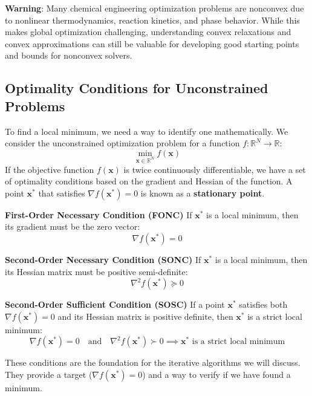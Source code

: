\begin{warningBox}
    \textbf{Warning}: Many chemical engineering optimization problems are nonconvex due to nonlinear thermodynamics, reaction kinetics, and phase behavior. While this makes global optimization challenging, understanding convex relaxations and convex approximations can still be valuable for developing good starting points and bounds for nonconvex solvers.
\end{warningBox}

\subsection{Optimality Conditions for Unconstrained Problems}
To find a local minimum, we need a way to identify one mathematically. We consider the unconstrained optimization problem for a function $f: \mathbb{R}^N \to \mathbb{R}$:
\begin{equation}
    \min_{\mathbf{x} \in \mathbb{R}^N} f(\mathbf{x})
\end{equation}
If the objective function $f(\mathbf{x})$ is twice continuously differentiable, we have a set of optimality conditions based on the gradient and Hessian of the function. A point $\mathbf{x}^*$ that satisfies $\nabla f(\mathbf{x}^*) = 0$ is known as a \textbf{stationary point}.

\begin{definitionBox}
\textbf{First-Order Necessary Condition (FONC)}
If $\mathbf{x}^*$ is a local minimum, then its gradient must be the zero vector:
\begin{equation}
    \nabla f(\mathbf{x}^*) = 0
\end{equation}
\end{definitionBox}

\begin{definitionBox}
\textbf{Second-Order Necessary Condition (SONC)}
If $\mathbf{x}^*$ is a local minimum, then its Hessian matrix must be positive semi-definite:
\begin{equation}
    \nabla^2 f(\mathbf{x}^*) \succeq 0
\end{equation}
\end{definitionBox}

\begin{definitionBox}
\textbf{Second-Order Sufficient Condition (SOSC)}
If a point $\mathbf{x}^*$ satisfies both $\nabla f(\mathbf{x}^*) = 0$ and its Hessian matrix is positive definite, then $\mathbf{x}^*$ is a strict local minimum:
\begin{equation}
    \nabla f(\mathbf{x}^*) = 0 \quad \text{and} \quad \nabla^2 f(\mathbf{x}^*) \succ 0 \implies \mathbf{x}^* \text{ is a strict local minimum}
\end{equation}
\end{definitionBox}
These conditions are the foundation for the iterative algorithms we will discuss. They provide a target ($\nabla f(\mathbf{x}^*) = 0$) and a way to verify if we have found a minimum.

